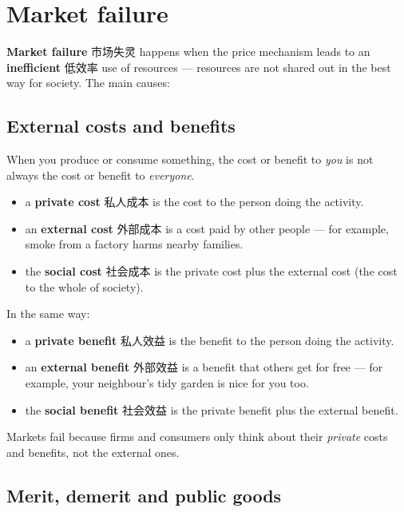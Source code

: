 \documentclass[11pt]{article}
\begin{document}
\section*{Market failure}

\textbf{Market failure} 市场失灵 happens when the price mechanism leads to an \textbf{inefficient} 低效率 use of resources — resources are not shared out in the best way for society. The main causes:

\subsection*{External costs and benefits}

When you produce or consume something, the cost or benefit to \emph{you} is not always the cost or benefit to \emph{everyone}.

\begin{itemize}
\item a \textbf{private cost} 私人成本 is the cost to the person doing the activity.

\item an \textbf{external cost} 外部成本 is a cost paid by other people — for example, smoke from a factory harms nearby families.

\item the \textbf{social cost} 社会成本 is the private cost plus the external cost (the cost to the whole of society).

\end{itemize}

In the same way:

\begin{itemize}
\item a \textbf{private benefit} 私人效益 is the benefit to the person doing the activity.

\item an \textbf{external benefit} 外部效益 is a benefit that others get for free — for example, your neighbour's tidy garden is nice for you too.

\item the \textbf{social benefit} 社会效益 is the private benefit plus the external benefit.

\end{itemize}

Markets fail because firms and consumers only think about their \emph{private} costs and benefits, not the external ones.

\subsection*{Merit, demerit and public goods}
\end{document}
